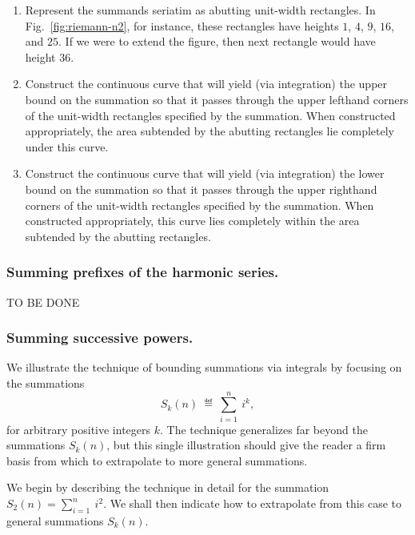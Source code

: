 \begin{enumerate}
\item
Represent the summands seriatim as abutting unit-width rectangles.  In
Fig.~\ref{fig:riemann-n2}, for instance, these rectangles have heights
$1$, $4$, $9$, $16$, and $25$.  If we were to extend the figure, then
next rectangle would have height $36$.

\item
Construct the continuous curve that will yield (via integration) the
upper bound on the summation so that it passes through the upper
lefthand corners of the unit-width rectangles specified by the
summation.  When constructed appropriately, the area subtended by the
abutting rectangles lie completely under this curve.

\item
Construct the continuous curve that will yield (via integration) the
lower bound on the summation so that it passes through the upper
righthand corners of the unit-width rectangles specified by the
summation.  When constructed appropriately, this curve lies completely
within the area subtended by the abutting rectangles.
\end{enumerate}

\subsubsection{Summing prefixes of the harmonic series.}
TO BE DONE



\subsubsection{Summing successive powers.}
We illustrate the technique of bounding summations via integrals by
focusing on the summations
\[ S_k(n) \ \eqdef \ \sum_{i=1}^n \ i^k, \]
for arbitrary positive integers $k$.  The technique generalizes far
beyond the summations $S_k(n)$, but this single illustration should
give the reader a firm basis from which to extrapolate to more general
summations.

We begin by describing the technique in detail for the summation
$\displaystyle S_2(n) = \sum_{i=1}^n \ i^2$.  We shall then indicate
how to extrapolate from this case to general summations $S_k(n)$.

